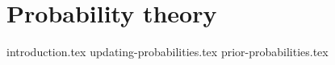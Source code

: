 \section{Probability theory}

{introduction.tex}
{updating-probabilities.tex}
{prior-probabilities.tex}